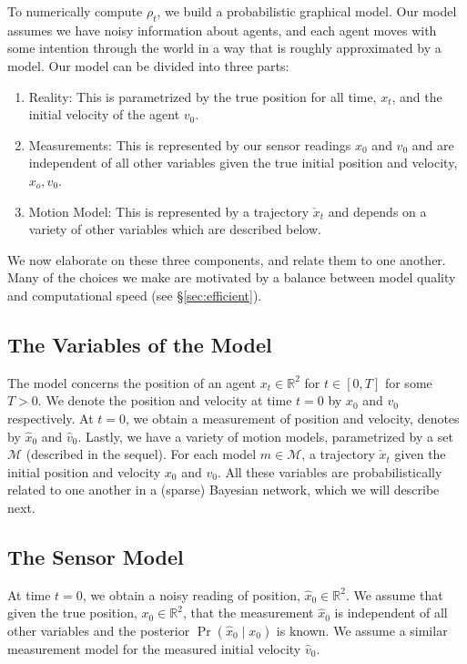 \documentclass[letterpaper,10pt,conference]{ieeeconf}
\begin{document}
To numerically compute $\rho_t$, we build a probabilistic graphical model.
Our model assumes we have noisy information about agents, and each agent moves with some intention through the world in a way that is roughly approximated by a model.
Our model can be divided into three parts:
\begin{enumerate}
	\item Reality: This is parametrized by the true position for all time, $x_t$, and the initial velocity of the agent $v_0$.
	\item Measurements:  This is represented by our sensor readings $\hat{x}_0$ and $\hat{v}_0$ and are independent of all other variables given the true initial position and velocity, $x_o, v_0$.
	\item Motion Model: This is represented by a trajectory $\check{x}_t$ and depends on a variety of other variables which are described below.
\end{enumerate}
We now elaborate on these three components, and relate them to one another.
Many of the choices we make are motivated by a balance between model quality and computational speed (see \S \ref{sec:efficient}).

\subsection{The Variables of the Model}
The model concerns the position of an agent $x_t \in \mathbb{R}^2$ for $t \in [0,T]$ for some $T>0$.
We denote the position and velocity at time $t=0$ by $x_0$ and $v_0$ respectively.
At $t=0$, we obtain a measurement of position and velocity, denotes by $\hat{x}_0$ and $\hat{v}_0$.
Lastly, we have a variety of motion models, parametrized by a set $\mathcal{M}$ (described in the sequel).
For each model $m \in \mathcal{M}$, a trajectory $\check{x}_t$ given the initial position and velocity $x_0$ and $v_0$.
All these variables are probabilistically related to one another in a (sparse) Bayesian network, which we will describe next.

\subsection{The Sensor Model}
At time $t=0$, we obtain a noisy reading of position, $\hat{x}_0 \in \mathbb{R}^2$.
We assume that given the true position, $x_0 \in \mathbb{R}^2$, that the measurement $\hat{x}_0$ is independent of all other variables and the posterior $\Pr( \hat{x}_0 \mid x_0)$ is known.
We assume a similar measurement model for the measured initial velocity $\hat{v}_0$.
\end{document}
